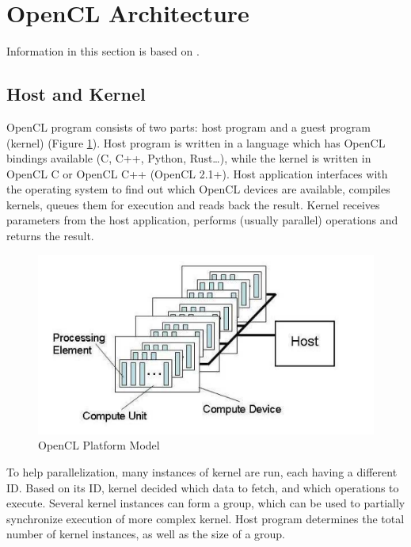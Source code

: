 
\section{OpenCL Architecture}

Information in this section is based on \cite{gaster2012heterogeneous}.

\subsection{Host and Kernel}

OpenCL program consists of two parts: host program and a guest program (kernel) (Figure \ref{fig:openclplatform}). Host program is written in a language which has OpenCL bindings available (C, C++, Python, Rust\dots), while the kernel is written in OpenCL C or OpenCL C++ (OpenCL 2.1+). Host application interfaces with the operating system to find out which OpenCL devices are available, compiles kernels, queues them for execution and reads back the result. Kernel receives parameters from the host application, performs (usually parallel) operations and returns the result.

\begin{figure}[h]
    \includegraphics[width=\linewidth]{Figures/platform.png}
    \caption{OpenCL Platform Model\cite{munshi2009opencl}}
    \label{fig:openclplatform}
\end{figure}

To help parallelization, many instances of kernel are run, each having a different ID. Based on its ID, kernel decided which data to fetch, and which operations to execute. Several kernel instances can form a group, which can be used to partially synchronize execution of more complex kernel. Host program determines the total number of kernel instances, as well as the size of a group.

